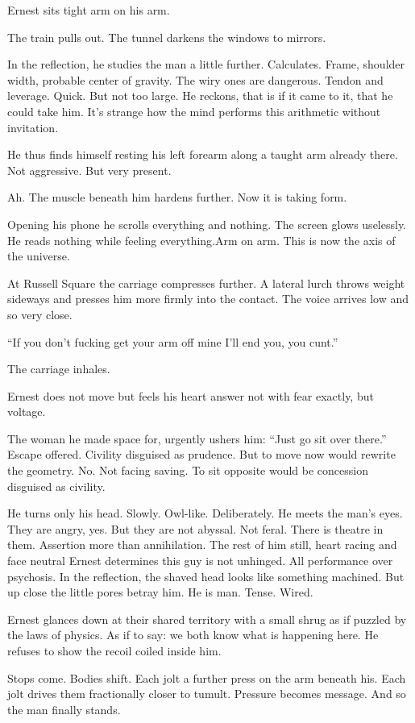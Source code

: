 Ernest sits tight arm on his arm. 

The train pulls out. The tunnel darkens the windows to mirrors.

In the reflection, he studies the man a little further. Calculates. Frame, shoulder width, probable center of gravity. The wiry ones are dangerous. Tendon and leverage. Quick. But not too large. He reckons, that is if it came to it, that he could take him.  It’s strange how the mind performs this arithmetic without invitation.

He thus finds himself resting his left forearm along a taught arm already there. Not aggressive. But very present.

Ah. The muscle beneath him hardens further. Now it is taking form.

Opening his phone he scrolls everything and nothing. The screen glows uselessly. He reads nothing while feeling everything.Arm on arm. This is now the axis of the universe.

At Russell Square the carriage compresses further. A lateral lurch throws weight sideways and presses him more firmly into the contact. The voice arrives low and so very close.

“If you don’t fucking get your arm off mine I’ll end you, you cunt.”

The carriage inhales.

Ernest does not move but feels his heart answer not with fear exactly, but voltage.

The woman he made space for, urgently ushers him: “Just go sit over there.” Escape offered. Civility disguised as prudence. But to move now would rewrite the geometry. No. Not facing saving. To sit opposite would be concession disguised as civility.

He turns only his head. Slowly. Owl-like. Deliberately. He meets the man’s eyes.
They are angry, yes. But they are not abyssal. Not feral. There is theatre in them. Assertion more than annihilation. The rest of him still, heart racing and face neutral Ernest determines this guy is not unhinged. All performance over psychosis. In the reflection, the shaved head looks like something machined. But up close the little pores betray him. He is man. Tense. Wired.

Ernest glances down at their shared territory with a small shrug as if puzzled by the laws of physics. As if to say: we both know what is happening here. He refuses to show the recoil coiled inside him.

Stops come. Bodies shift. Each jolt a further press on the arm beneath his. Each jolt drives them fractionally closer to tumult. Pressure becomes message. And so the man finally stands.

